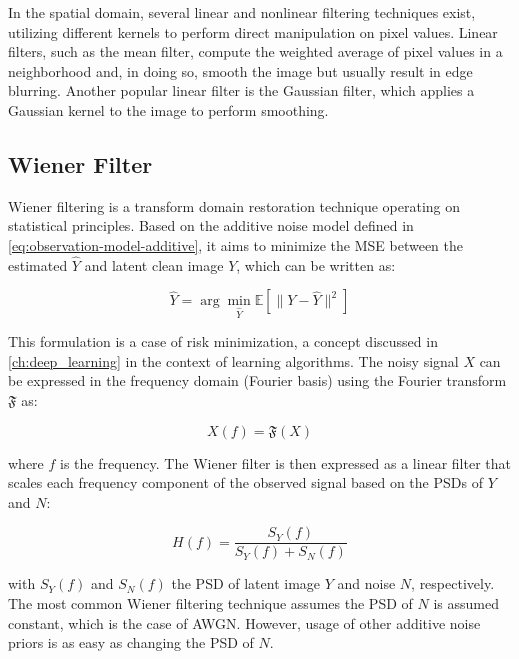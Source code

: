 In the spatial domain, several linear and nonlinear filtering techniques exist, utilizing different kernels to perform direct manipulation on pixel values. Linear filters, such as the mean filter, compute the weighted average of pixel values in a neighborhood and, in doing so, smooth the image but usually result in edge blurring. Another popular linear filter is the Gaussian filter, which applies a Gaussian kernel to the image to perform smoothing.

\subsection{Wiener Filter}
Wiener filtering is a transform domain restoration technique operating on statistical principles. Based on the additive noise model defined in \cref{eq:observation-model-additive}, it aims to minimize the \gls{MSE} between the estimated $\hat{Y}$ and latent clean image $Y$, which can be written as:

\begin{equation}\label{eq:wiener-mse}
    \hat{Y} = \arg \min_{\hat{Y}} \mathbb{E} \left[ \| Y - \hat{Y} \|^2 \right]
\end{equation}

This formulation is a case of risk minimization, a concept discussed in \cref{ch:deep_learning} in the context of learning algorithms. The noisy signal $X$ can be expressed in the frequency domain (Fourier basis) using the Fourier transform $\mathfrak{F}$ as:

\begin{equation*}
    X(f) = \mathfrak{F}(X)
\end{equation*}

where $f$ is the frequency. The Wiener filter is then expressed as a linear filter that scales each frequency component of the observed signal based on the \glspl{PSD} of $Y$ and $N$: 

\begin{equation*}
H(f) = \frac{S_Y(f)}{S_Y(f) + S_N(f)}
\end{equation*}

with $S_Y(f)$ and $S_N(f)$ the \gls{PSD} of latent image $Y$ and noise $N$, respectively. The most common Wiener filtering technique assumes the \gls{PSD} of $N$ is assumed constant, which is the case of \gls{AWGN}. However, usage of other additive noise priors is as easy as changing the \gls{PSD} of $N$.

